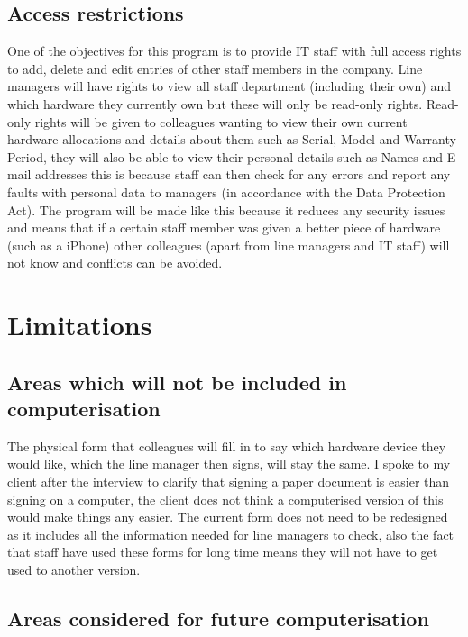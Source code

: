 \subsection{Access restrictions}

One of the objectives for this program is to provide IT staff with full access rights to add, delete and edit entries of other staff members in the company. Line managers will have rights to view all staff department (including their own) and which hardware they currently own but these will only be read-only rights. Read-only rights will be given to colleagues wanting to view their own current hardware allocations and details about them such as Serial, Model and Warranty Period, they will also be able to view their personal details such as Names and E-mail addresses this is because staff can then check for any errors and report any faults with personal data to managers (in accordance with the Data Protection Act). The program will be made like this because it reduces any security issues and means that if a certain staff member was given a better piece of hardware (such as a iPhone) other colleagues (apart from line managers and IT staff) will not know and conflicts can be avoided.

\section{Limitations}

\subsection{Areas which will not be included in computerisation}

The physical form that colleagues will fill in to say which hardware device they would like, which the line manager then signs, will stay the same. I spoke to my client after the interview to clarify that signing a paper document is easier than signing on a computer, the client does not think a computerised version of this would make things any easier. The current form does not need to be redesigned as it includes all the information needed for line managers to check, also the fact that staff have used these forms for long time means they will not have to get used to another version.

\subsection{Areas considered for future computerisation}

